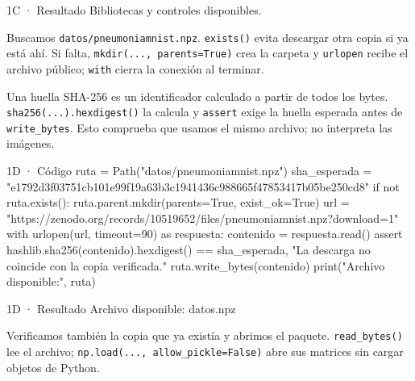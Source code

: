 \begin{Salida}{1C · Resultado}
Bibliotecas y controles disponibles.
\end{Salida}

\label{paso-1d}

Buscamos \texttt{\small datos/\allowbreak{}pneumoniamnist.\allowbreak{}npz}. \texttt{\small exists(\allowbreak{})\allowbreak{}} evita descargar otra copia si ya está ahí. Si falta, \texttt{\small mkdir(\allowbreak{}.\allowbreak{}.\allowbreak{}.\allowbreak{},\allowbreak{} parents=\allowbreak{}True)\allowbreak{}} crea la carpeta y \texttt{\small urlopen} recibe el archivo público; \texttt{\small with} cierra la conexión al terminar.

Una huella SHA-256 es un identificador calculado a partir de todos los bytes. \texttt{\small sha256(\allowbreak{}.\allowbreak{}.\allowbreak{}.\allowbreak{})\allowbreak{}.\allowbreak{}hexdigest(\allowbreak{})\allowbreak{}} la calcula y \texttt{\small assert} exige la huella esperada antes de \texttt{\small write\_\allowbreak{}bytes}. Esto comprueba que usamos el mismo archivo; no interpreta las imágenes.


\begin{Codigo}{1D · Código}
ruta = Path("datos/pneumoniamnist.npz")
sha_esperada = "e1792d3f03751cb101e99f19a63b3c1941436c988665f47853417b05be250cd8"
if not ruta.exists():
    ruta.parent.mkdir(parents=True, exist_ok=True)
    url = "https://zenodo.org/records/10519652/files/pneumoniamnist.npz?download=1"
    with urlopen(url, timeout=90) as respuesta:
        contenido = respuesta.read()
    assert hashlib.sha256(contenido).hexdigest() == sha_esperada, "La descarga no coincide con la copia verificada."
    ruta.write_bytes(contenido)
print("Archivo disponible:", ruta)
\end{Codigo}

\begin{Salida}{1D · Resultado}
Archivo disponible: datos\pneumoniamnist.npz
\end{Salida}

\label{paso-1e}

Verificamos también la copia que ya existía y abrimos el paquete. \texttt{\small read\_\allowbreak{}bytes(\allowbreak{})\allowbreak{}} lee el archivo; \texttt{\small np.\allowbreak{}load(\allowbreak{}.\allowbreak{}.\allowbreak{}.\allowbreak{},\allowbreak{} allow\_\allowbreak{}pickle=\allowbreak{}False)\allowbreak{}} abre sus matrices sin cargar objetos de Python.

